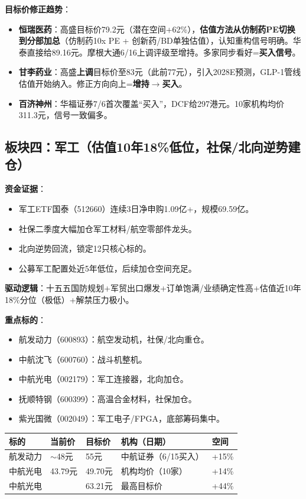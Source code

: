 \documentclass[a4paper,11pt,fontset=none]{ctexart}
\begin{document}
\textbf{目标价修正趋势}：
\begin{itemize}
  \item \textbf{恒瑞医药}：高盛目标价79.2元（潜在空间+62\%），\textbf{估值方法从仿制药PE切换到分部加总}（仿制药10x PE + 创新药/BD单独估值），认知重构信号明确。华泰直接给89.16元。摩根大通6/16上调评级至增持。多家同步看好=\textbf{买入信号}。
  \item \textbf{甘李药业}：高盛\textbf{上调}目标价至83元（此前77元），引入2028E预测，GLP-1管线估值开始纳入。修正方向向上=\textbf{增持$\to$买入}。
  \item \textbf{百济神州}：华福证券7/6首次覆盖``买入''，DCF给297港元。10家机构均价311.3元，信号一致偏多。
\end{itemize}

\subsection*{板块四：军工（估值10年18\%低位，社保/北向逆势建仓）}

\textbf{资金证据}：
\begin{itemize}
  \item 军工ETF国泰（512660）连续3日净申购1.09亿+，规模69.59亿。
  \item 社保二季度大幅加仓军工材料/航空零部件龙头。
  \item 北向逆势回流，锁定12只核心标的。
  \item 公募军工配置处近5年低位，后续加仓空间充足。
\end{itemize}

\textbf{驱动逻辑}：十五五国防规划+军贸出口爆发+订单饱满/业绩确定性高+估值近10年18\%分位（极低）+解禁压力极小。

\textbf{重点标的}：
\begin{itemize}
  \item 航发动力（600893）：航空发动机，社保/北向重仓。
  \item 中航沈飞（600760）：战斗机整机。
  \item 中航光电（002179）：军工连接器，北向加仓。
  \item 抚顺特钢（600399）：高温合金材料，社保加仓。
  \item 紫光国微（002049）：军工电子/FPGA，底部筹码集中。
\end{itemize}

\begin{tabularx}{\textwidth}{L{2.5cm}L{2cm}L{2cm}L{3.5cm}X}
\toprule
\textbf{标的} & \textbf{当前价} & \textbf{目标价} & \textbf{机构（日期）} & \textbf{空间} \\
\midrule
航发动力 & $\sim$48元 & 55元 & 中航证券（6/15买入） & +15\% \\
中航光电 & 43.79元 & 49.70元 & 机构均价（10家） & +14\% \\
中航光电 & & 63.21元 & 最高目标价 & +44\% \\
\bottomrule
\end{tabularx}
\end{document}
